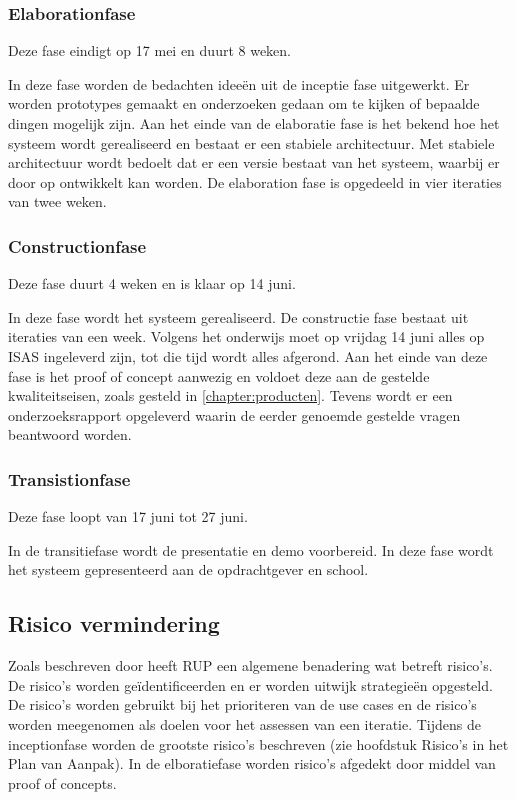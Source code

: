 \documentclass[a4paper, 11pt, oneside]{report}
\begin{document}
\subsubsection{Elaborationfase}
\label{sec:elaborationfase}
Deze fase eindigt op 17 mei  en duurt 8 weken.

In deze fase worden de bedachten ideeën uit de inceptie fase uitgewerkt.
Er worden prototypes gemaakt en onderzoeken gedaan om te kijken of bepaalde dingen mogelijk zijn.
Aan het einde van de elaboratie fase is het bekend hoe het systeem wordt gerealiseerd en bestaat er een stabiele architectuur.
Met stabiele architectuur wordt bedoelt dat er een versie bestaat van het systeem, waarbij er door op ontwikkelt kan worden.
De elaboration fase is opgedeeld in vier iteraties van twee weken.

\subsubsection{Constructionfase}
\label{sec:constructionfase}
Deze fase duurt 4 weken en is klaar op 14 juni.

In deze fase wordt het systeem gerealiseerd. De constructie fase bestaat uit iteraties van een week.
Volgens het onderwijs moet op vrijdag 14 juni alles op ISAS ingeleverd zijn, tot die tijd wordt alles afgerond.
Aan het einde van deze fase is het proof of concept aanwezig en voldoet deze aan de gestelde kwaliteitseisen, zoals gesteld in \autoref{chapter:producten}.
Tevens wordt er een onderzoeksrapport opgeleverd waarin de eerder genoemde gestelde vragen beantwoord worden.

\subsubsection{Transistionfase}
Deze fase loopt van 17 juni tot 27 juni.

In de transitiefase wordt de presentatie en demo voorbereid. 
In deze fase wordt het systeem gepresenteerd aan de opdrachtgever en school.

\subsection{Risico vermindering}
Zoals beschreven door \citeauthor{IBMrup}\citeyear{IBMrup} heeft RUP een algemene benadering wat betreft risico's. De risico's worden geïdentificeerden en er worden uitwijk strategieën opgesteld. De risico's worden gebruikt bij het prioriteren van de use cases en de risico's worden meegenomen als doelen voor het assessen van een iteratie. Tijdens de inceptionfase worden de grootste risico's beschreven (zie hoofdstuk Risico's in het Plan van Aanpak). In de elboratiefase worden risico's afgedekt door middel van proof of concepts.
\end{document}
